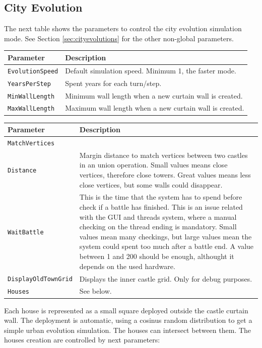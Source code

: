 \documentclass[tog]{acmsiggraph}
\begin{document}
\subsection{City Evolution}
\label{sec:settingscity}

The next table shows the parameters to control the city evolution simulation mode. 
See Section \ref{sec:cityevolutions} for the other non-global parameters.


\begin{tabularx}{0.48\textwidth}{ |X|X| }
\hline 
\textbf{Parameter} & \textbf{Description} \\[0.15cm]
 \hline
 \texttt{EvolutionSpeed} & Default simulation speed. Minimum 1, the faster mode. \\
 \hline
 \texttt{YearsPerStep} & Spent years for each turn/step.\\
 \hline
 \texttt{MinWallLength} & Minimum wall length when a new curtain wall is created. \\
 \hline
 \texttt{MaxWallLength} & Maximum wall length when a new curtain wall is created. \\
 \hline
\end{tabularx}  
 
\begin{tabularx}{0.48\textwidth}{ |l|X| }
\hline 
\textbf{Parameter} & \textbf{Description} \\[0.15cm]
 \hline
 \texttt{MatchVertices} & \\
 \texttt{Distance} &  Margin distance to match vertices between two castles in an union operation. Small values means close vertices, therefore close towers. 
 Great values means less close vertices, but some walls could disappear.\\
 \hline
 \texttt{WaitBattle} & This is the time that the system has to spend before check if a battle has finished. This is an issue related with the GUI and threads system, where a manual checking on the thread ending is mandatory. Small values mean many checkings, but large values mean the system could spent too much after a battle end. A value between 1 and 200 should be enough, althought it depends on the used hardware. \\
 \hline
 \texttt{DisplayOldTownGrid} & Displays the inner castle grid. Only for debug purposes. \\
 \hline
 \texttt{Houses} & See below.\\
 \hline
\end{tabularx}


Each house is represented as a small square deployed outside the castle curtain wall. 
The deployment is automatic, using a cosinus random distribution to get a simple urban evolution simulation.
The houses can intersect between them.
The houses creation are controlled by next parameters:
\end{document}
